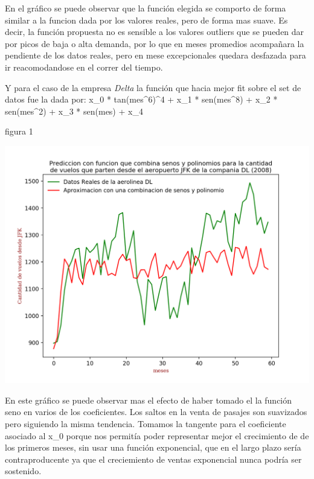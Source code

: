 \documentclass{endm}
\begin{document}
En el gr\'afico se puede observar que la funci\'on elegida se comporto de forma similar a la funcion dada por los valores reales, pero de forma mas suave. Es decir, la funci\'on propuesta no es sensible a los valores outliers que se pueden dar por picos de baja o alta demanda, por lo que en meses promedios acompa\~nara la pendiente de los datos reales, pero en mese excepcionales quedara desfazada para ir reacomodandose en el correr del tiempo.

Y para el caso de la empresa \textit{Delta} la funci\'on que hacia mejor fit sobre el set de datos fue la dada por:
x_0 * tan(mes^6)^4 + x_1 * sen(mes^8) + x_2 * sen(mes^2) + x_3 * sen(mes) +  x_4


\begin{center}
\caption{figura 1}
\includegraphics[scale=0.5]{imagenes/DL.png}
\end{center}

En este gr\'afico se puede observar mas el efecto de haber tomado el la funci\'on seno en varios de los coeficientes. Los saltos en la venta de pasajes son suavizados pero siguiendo la misma tendencia. Tomamos la tangente para el coeficiente asociado al x_0 porque nos permit\'ia poder representar mejor el crecimiento de de los primeros meses, sin usar una funci\'on exponencial, que en el largo plazo ser\'ia contraproducente ya que el creciemiento de ventas exponencial nunca podr\'ia ser sostenido.
\end{document}
